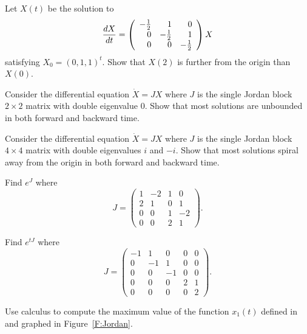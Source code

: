 \documentclass{ximera}
\begin{document}
\begin{exercise} \label{c11.1.3}
Let $X(t)$ be the solution to 
\[
\frac{dX}{dt} = \left(\begin{array}{rrr} 
-\mbox{$\frac{1}{2}$} & 1 & 0 \\ 0 & -\mbox{$\frac{1}{2}$} & 1\\ 0 & 0 & -\mbox{$\frac{1}{2}$}
\end{array}\right)X
\]
satisfying $X_0=(0,1,1)^t$. Show that $X(2)$ is further from the 
origin than $X(0)$.
\end{exercise}

\begin{exercise} \label{c11.1.3A}
Consider the differential equation $\dot{X}=JX$ where $J$ is the single Jordan 
block $2\times 2$ matrix with double eigenvalue $0$.  Show that most 
solutions are unbounded in both forward and backward time.
\end{exercise}


\begin{exercise} \label{c11.1.3B}
Consider the differential equation $\dot{X}=JX$ where $J$ is the single Jordan 
block $4\times 4$ matrix with double eigenvalues $i$ and $-i$.  Show that most 
solutions spiral away from the origin in both forward and backward time.
\end{exercise} 

\begin{exercise} \label{c11.1.3C}
Find $e^J$ where 
\[
J = \left(\begin{array}{rrrr} 
1 & -2 & 1 &  0 \\ 
2 &  1 & 0 &  1 \\
0 &  0 & 1 & -2 \\
0 &  0 & 2 &  1
\end{array}\right).
\]
\end{exercise}

\begin{exercise} \label{c11.1.7}
Find $e^{tJ}$ where 
\[
J = \left(\begin{array}{rrrrr} 
-1 &  1 &  0 &  0 & 0 \\ 
 0 & -1 &  1 &  0 & 0 \\
 0 &  0 & -1 &  0 & 0 \\
 0 &  0 &  0 &  2 & 1 \\
 0 &  0 &  0 &  0 & 2
\end{array}\right).
\]
\end{exercise}

\CEXER

\begin{exercise} \label{c11.1.4}
Use calculus to compute the maximum value of the function $x_1(t)$ 
defined in  and graphed in Figure~\ref{F:Jordan}.
\end{exercise}
\end{document}
